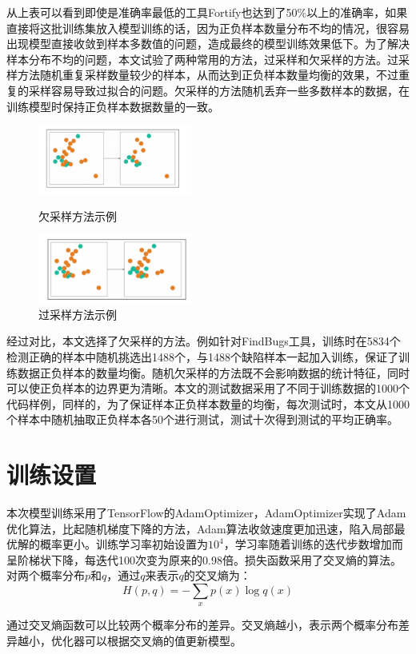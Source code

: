 从上表可以看到即使是准确率最低的工具Fortify也达到了50\%以上的准确率，如果直接将这批训练集放入模型训练的话，因为正负样本数量分布不均的情况，很容易出现模型直接收敛到样本多数值的问题，造成最终的模型训练效果低下。为了解决样本分布不均的问题，本文试验了两种常用的方法，过采样和欠采样的方法。过采样方法随机重复采样数量较少的样本，从而达到正负样本数量均衡的效果，不过重复的采样容易导致过拟合的问题。欠采样的方法随机丢弃一些多数样本的数据，在训练模型时保持正负样本数据数量的一致。
\begin{figure}[h]
	\parbox[h]{.5\textwidth}{\centering
		\includegraphics[width=0.45\textwidth]{figures/7.pdf}
		\caption{欠采样方法示例}}
	\parbox[h]{.5\textwidth}{\centering
		\includegraphics[width=0.45\textwidth]{figures/8.pdf}
		\caption{过采样方法示例}}
\end{figure}

经过对比，本文选择了欠采样的方法。例如针对FindBugs工具，训练时在5834个检测正确的样本中随机挑选出1488个，与1488个缺陷样本一起加入训练，保证了训练数据正负样本的数量均衡。随机欠采样的方法既不会影响数据的统计特征，同时可以使正负样本的边界更为清晰。本文的测试数据采用了不同于训练数据的1000个代码样例，同样的，为了保证样本正负样本数量的均衡，每次测试时，本文从1000个样本中随机抽取正负样本各50个进行测试，测试十次得到测试的平均正确率。

\section{训练设置}
本次模型训练采用了TensorFlow的AdamOptimizer，AdamOptimizer实现了Adam优化算法，比起随机梯度下降的方法，Adam算法收敛速度更加迅速，陷入局部最优解的概率更小。训练学习率初始设置为$10^{4}$，学习率随着训练的迭代步数增加而呈阶梯状下降，每迭代100次变为原来的0.98倍。损失函数采用了交叉熵的算法。对两个概率分布$p$和$q$，通过$q$来表示$q$的交叉熵为：
$$H(p,q) = -\sum_x p(x)\log q(x)$$

通过交叉熵函数可以比较两个概率分布的差异。交叉熵越小，表示两个概率分布差异越小，优化器可以根据交叉熵的值更新模型。

